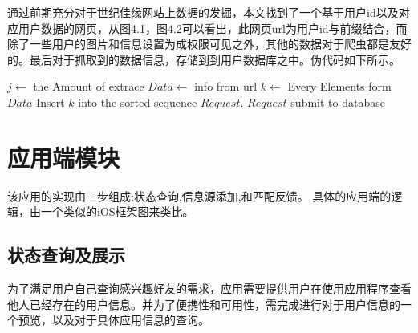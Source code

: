 通过前期充分对于世纪佳缘网站上数据的发掘，本文找到了一个基于用户id以及对应用户数据的网页，从图4.1，图4.2可以看出，此网页url为用户id与前缀结合，而除了一些用户的图片和信息设置为成权限可见之外，其他的数据对于爬虫都是友好的。最后对于抓取到的数据信息，存储到到用户数据库之中。伪代码如下所示。

\begin{codebox}
\li \For $j \gets $ \To the Amount of extrace \label{li:for}
\li     \Do \label{li:for-begin}
\li 	$Data \gets$ info from url
\li \For $k \gets$ Every Elements form $Data$\label{li:for}
\li     \Do \label{li:for-begin}
\li      Insert $k$ into the sorted sequence $Request$.
\label{li:for-end}
                \End
\li         $Request$ submit to database       \label{li:for-end}
        \End
\end{codebox}



\section{应用端模块}
该应用的实现由三步组成:状态查询,信息源添加,和匹配反馈。
具体的应用端的逻辑，由一个类似的iOS框架图来类比。

\subsection{状态查询及展示}
为了满足用户自己查询感兴趣好友的需求，应用需要提供用户在使⽤应⽤程序查看他人已经存在的用户信息。并为了便携性和可用性，需完成进行对于用户信息的一个预览，以及对于具体应用信息的查询。

